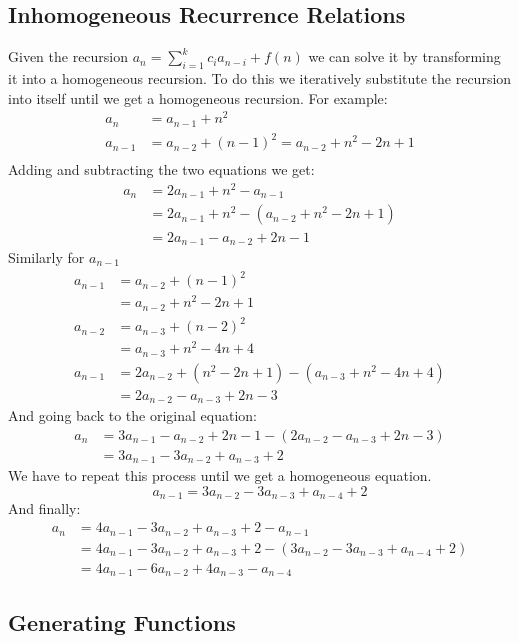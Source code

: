 \subsection{Inhomogeneous Recurrence Relations}
Given the recursion \( a_n = \sum_{i=1}^{k} c_i a_{n-i} + f(n) \) we can solve it by transforming it into a homogeneous recursion. To do this we iteratively substitute the recursion into itself until we get a homogeneous recursion. For example:
\begin{align*}
    a_n &= a_{n-1} + n^2 \\
    a_{n-1} &= a_{n-2} + \left( n - 1 \right)^2 = a_{n-2} + n^2 - 2n + 1 \\
\end{align*}
Adding and subtracting the two equations we get:
\begin{align*}
    a_n &= 2 a_{n-1} + n^2 - a_{n-1} \\
    &= 2 a_{n-1} + n^2 - \left( a_{n-2}  + n^2  - 2n + 1 \right) \\
    &= 2 a_{n-1} - a_{n-2} + 2n - 1
\end{align*}
Similarly for \( a_{n-1} \)  
\begin{align*}
    a_{n-1} &= a_{n-2} + \left( n - 1 \right)^2 \\
    &= a_{n-2} + n^2 - 2n + 1 \\
    a_{n-2} &= a_{n-3} + \left( n - 2 \right)^2 \\
    &= a_{n-3} + n^2 - 4n + 4 \\
    a_{n-1} &= 2 a_{n-2} + \left( n^2 - 2n + 1 \right) - \left( a_{n-3} + n^2 - 4n + 4 \right) \\
    &= 2 a_{n-2} - a_{n-3} + 2n - 3
\end{align*}
And going back to the original equation:
\begin{align*}
    a_n &= 3 a_{n-1} - a_{n-2} + 2n - 1 - \left( 2a_{n-2} - a_{n-3} + 2n - 3 \right) \\
    &= 3 a_{n-1} - 3 a_{n-2} + a_{n-3} + 2
\end{align*}
We have to repeat this process until we get a homogeneous equation.
\begin{equation*}
    a_{n-1} = 3 a_{n-2} - 3 a_{n-3} + a_{n-4} + 2
\end{equation*}
And finally:
\begin{align*}
    a_n &= 4 a_{n-1} - 3 a_{n-2} + a_{n-3} + 2 - a_{n-1}\\
     &= 4 a_{n-1} - 3 a_{n-2} + a_{n-3} + 2 - \left( 3 a_{n-2} - 3 a_{n-3} + a_{n-4} + 2 \right) \\
    &= 4 a_{n-1} - 6 a_{n-2} + 4 a_{n-3} - a_{n-4}
\end{align*}


\subsection{Generating Functions}
